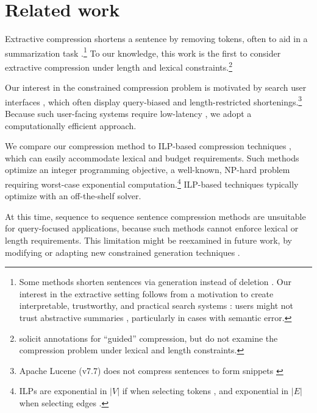 \documentclass[11pt,a4paper]{article}
\begin{document}
\section{Related work}\label{s:relatedwork}

Extractive compression \cite{Knight2000StatisticsBasedS,clarke2008global,filippova2015sentence,Wang2017CanSH} shortens a sentence by removing tokens, often to aid in a summarization task \cite{Knight2000StatisticsBasedS,almeida2013fast,P16-1188}.\footnote{Some methods shorten sentences via generation instead of deletion \cite{rush2015neural,mallinson18}. Our interest in the extractive setting follows from a motivation to create interpretable,  trustworthy, and practical search systems \cite{Chuang2012InterpretationAT}: users might not trust abstractive summaries \cite{Zhang:2018:MSG:3290265.3274465}, particularly in cases with semantic error.} To our knowledge, this work is the first to consider extractive compression under length and lexical constraints.\footnote{\citet{Li2013DocumentSV} solicit annotations for ``guided'' compression, but do not examine the compression problem under lexical and length constraints.}

Our interest in the constrained compression problem is motivated by search user interfaces \cite{hearst2009search}, which often display query-biased \cite{tombros1998advantages} and length-restricted shortenings.\footnote{Apache Lucene {\small (v7.7)} does not compress sentences to form snippets \cite{lucene}} 
Because such user-facing systems require low-latency \cite{Nielsen,heerschei,Liu2014TheEO}, we adopt a computationally efficient approach. 

We compare our compression method to ILP-based compression techniques \cite{clarke2008global,filippova2008dependency,filippova2013overcoming,Wang2017CanSH}, which can easily accommodate lexical and budget requirements. Such methods optimize an integer programming objective, a well-known, NP-hard problem \cite{clarke2008global} requiring worst-case exponential computation.\footnote{ILPs are exponential in $|V|$ if when selecting tokens \cite{clarke2008global}, and exponential in $|E|$ when selecting edges \cite{filippova2013overcoming}.} ILP-based techniques typically optimize with an off-the-shelf solver. 

At this time, sequence to sequence sentence compression methods \cite{filippova2015sentence} are unsuitable for query-focused applications, because such methods cannot enforce lexical or length requirements. This limitation might be reexamined in future work, by modifying or adapting new constrained generation techniques \cite{N18-1119,aaimh}.
\end{document}
